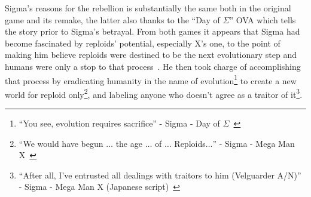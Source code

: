 Sigma's reasons for the rebellion is substantially the same both in the original game and its remake, the latter also thanks to the ``Day of $\Sigma$'' OVA which tells the story prior to Sigma's betrayal. From both games it appears that Sigma had become fascinated by reploids' potential, especially X's one, to the point of making him believe reploids were destined to be the next evolutionary step and humans were only a stop to that process~\cite{X:Manual}. He then took charge of accomplishing that process by eradicating humanity in the name of evolution\footnote{\enquote{You see, evolution requires sacrifice} - Sigma - Day of $\Sigma$~\cite{wiki:Day_of_Sigma_Script}} to create a new world for reploid  only\footnote{\enquote{We would have begun $\dots$ the age $\dots$ of $\dots$ Reploids$\dots$} - Sigma - Mega Man X~\cite{wiki:MMX_script}}, and labeling anyone who doesn't agree as a traitor of it\footnote{\enquote{After all, I’ve entrusted all dealings with traitors to him (Velguarder A/N)} - Sigma - Mega Man X (Japanese script)~\cite{wordpress:X_japanese_script}}.

